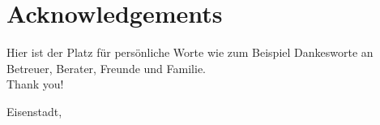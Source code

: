 \thispagestyle{empty}
\chapter{Acknowledgements}
Hier ist der Platz für persönliche Worte wie zum Beispiel Dankesworte an Betreuer, Berater, Freunde und Familie. \\
Thank you! 
\lipsum[2-4] 
\vspace{2cm} 


\begin{flushleft}
    \yourNameInclTitle 
\end{flushleft}
Eisenstadt, \thesisDate 

\clearpage
